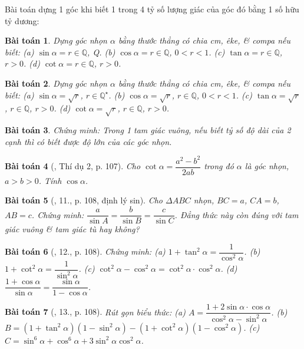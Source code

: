 \documentclass{article}
\newtheorem{baitoan}{Bài toán}
\begin{document}
Bài toán dựng 1 góc khi biết 1 trong 4 tỷ số lượng giác của góc đó bằng 1 số hữu tỷ dương:

\begin{baitoan}
	Dựng góc nhọn $\alpha$ bằng thước thẳng có chia {\rm cm}, êke, \& compa nếu biết: (a) $\sin\alpha = r\in\mathbb{Q}$, Q. (b) $\cos\alpha = r\in\mathbb{Q}$, $0 < r < 1$. (c) $\tan\alpha = r\in\mathbb{Q}$, $r > 0$. (d) $\cot\alpha = r\in\mathbb{Q}$, $r > 0$.
\end{baitoan}

\begin{baitoan}
	Dựng góc nhọn $\alpha$ bằng thước thẳng có chia {\rm cm}, êke, \& compa nếu biết: (a) $\sin\alpha = \sqrt{r}$, $r\in\mathbb{Q}^\star$. (b) $\cos\alpha = \sqrt{r}$, $r\in\mathbb{Q}$, $0 < r < 1$. (c) $\tan\alpha = \sqrt{r}$, $r\in\mathbb{Q}$, $r > 0$. (d) $\cot\alpha = \sqrt{r}$, $r\in\mathbb{Q}$, $r > 0$.
\end{baitoan}

\begin{baitoan}
	Chứng minh: Trong 1 tam giác vuông, nếu biết tỷ số độ dài của 2 cạnh thì có biết được độ lớn của các góc nhọn.
\end{baitoan}


\begin{baitoan}[\cite{Tuyen_Toan_9}, Thí dụ 2, p. 107]
	Cho $\cot\alpha = \dfrac{a^2 - b^2}{2ab}$ trong đó $\alpha$ là góc nhọn, $a > b > 0$. Tính $\cos\alpha$.
\end{baitoan}

\begin{baitoan}[\cite{Tuyen_Toan_9}, 11., p. 108, định lý sin]
	Cho $\Delta ABC$ nhọn, $BC = a$, $CA = b$, $AB = c$. Chứng minh: $\dfrac{a}{\sin A} = \dfrac{b}{\sin B} = \dfrac{c}{\sin C}$. Đẳng thức này còn đúng với tam giác vuông \& tam giác tù hay không?
\end{baitoan}

\begin{baitoan}[\cite{Tuyen_Toan_9}, 12., p. 108]
	Chứng minh: (a) $1 + \tan^2\alpha = \dfrac{1}{\cos^2\alpha}$. (b) $1 + \cot^2\alpha = \dfrac{1}{\sin^2\alpha}$. (c) $\cot^2\alpha - \cos^2\alpha = \cot^2\alpha\cdot\cos^2\alpha$. (d) $\dfrac{1 + \cos\alpha}{\sin\alpha} = \dfrac{\sin\alpha}{1 - \cos\alpha}$.
\end{baitoan}

\begin{baitoan}[\cite{Tuyen_Toan_9}, 13., p. 108]
	Rút gọn biểu thức: (a) $A = \dfrac{1 + 2\sin\alpha\cdot\cos\alpha}{\cos^2\alpha - \sin^2\alpha}$. (b) $B = (1 + \tan^2\alpha)(1 - \sin^2\alpha) - (1 + \cot^2\alpha)(1 - \cos^2\alpha)$. (c) $C = \sin^6\alpha + \cos^6\alpha + 3\sin^2\alpha\cos^2\alpha$.
\end{baitoan}
\end{document}
